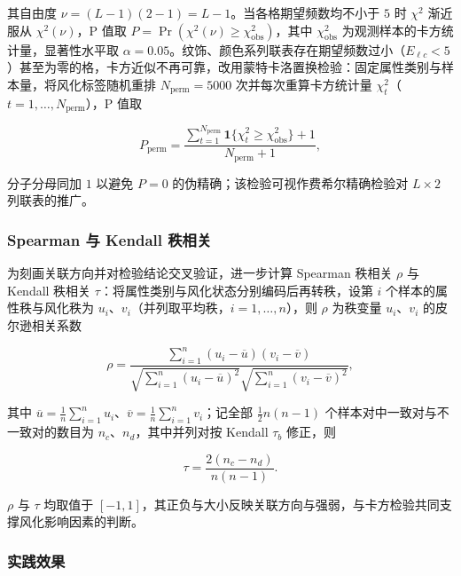 \documentclass{ctexart}
\begin{document}
其自由度 $\nu=(L-1)(2-1)=L-1$。当各格期望频数均不小于 $5$ 时 $\chi^{2}$ 渐近服从 $\chi^{2}(\nu)$，P 值取 $P=\Pr(\chi^{2}(\nu)\ge\chi_{\mathrm{obs}}^{2})$，其中 $\chi_{\mathrm{obs}}^{2}$ 为观测样本的卡方统计量，显著性水平取 $\alpha=0.05$。纹饰、颜色系列联表存在期望频数过小（$E_{\ell c}<5$）甚至为零的格，卡方近似不再可靠，改用蒙特卡洛置换检验：固定属性类别与样本量，将风化标签随机重排 $N_{\mathrm{perm}}=5000$ 次并每次重算卡方统计量 $\chi_{t}^{2}$（$t=1,\dots,N_{\mathrm{perm}}$），P 值取

\begin{equation*}
P_{\mathrm{perm}}=\frac{\sum_{t=1}^{N_{\mathrm{perm}}}\mathbf{1}\{\chi_{t}^{2}\ge\chi_{\mathrm{obs}}^{2}\}+1}{N_{\mathrm{perm}}+1},
\end{equation*}

分子分母同加 $1$ 以避免 $P=0$ 的伪精确；该检验可视作费希尔精确检验对 $L\times2$ 列联表的推广。


\subsubsection{Spearman 与 Kendall 秩相关}

为刻画关联方向并对检验结论交叉验证，进一步计算 Spearman 秩相关 $\rho$ 与 Kendall 秩相关 $\tau$：将属性类别与风化状态分别编码后再转秩，设第 $i$ 个样本的属性秩与风化秩为 $u_{i}$、$v_{i}$（并列取平均秩，$i=1,\dots,n$），则 $\rho$ 为秩变量 $u_{i}$、$v_{i}$ 的皮尔逊相关系数

\begin{equation*}
\rho=\frac{\sum_{i=1}^{n}(u_{i}-\overline{u})(v_{i}-\overline{v})}{\sqrt{\sum_{i=1}^{n}(u_{i}-\overline{u})^{2}}\sqrt{\sum_{i=1}^{n}(v_{i}-\overline{v})^{2}}},
\end{equation*}

其中 $\overline{u}=\frac{1}{n}\sum_{i=1}^{n}u_{i}$、$\overline{v}=\frac{1}{n}\sum_{i=1}^{n}v_{i}$；记全部 $\frac{1}{2}n(n-1)$ 个样本对中一致对与不一致对的数目为 $n_{c}$、$n_{d}$，其中并列对按 Kendall $\tau_{b}$ 修正，则

\begin{equation*}
\tau=\frac{2(n_{c}-n_{d})}{n(n-1)}.
\end{equation*}

$\rho$ 与 $\tau$ 均取值于 $[-1,1]$，其正负与大小反映关联方向与强弱，与卡方检验共同支撑风化影响因素的判断。


\subsubsection{实践效果}
\end{document}
